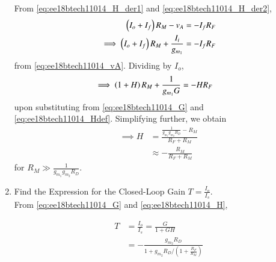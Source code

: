 \begin{enumerate}[label=\thesubsection.\arabic*.,ref=\thesubsection.\theenumi]
From \eqref{eq:ee18btech11014_H_der1}
 and \eqref{eq:ee18btech11014_H_der2},
\begin{align}
\left(I_o + I_f\right)R_M - v_{A} &= -I_fR_F
\\
\implies \left(I_o + I_f\right)R_M + \frac{I_i}{g_{m_1}} &=-I_fR_F
\end{align}
from  \eqref{eq:ee18btech11014_vA}. Dividing by  $I_o $,%
\begin{align}
\implies \left(1 + H\right)R_M + \frac{1}{g_{m_1}G} &=-HR_F 
\end{align}
%
upon substituting from \eqref{eq:ee18btech11014_G}
and \eqref{eq:ee18btech11014_Hdef}.  Simplifying further, we obtain
%
\begin{align}
\implies H &= \frac{\frac{1}{g_{m_1}g_{m_2}R_D} - R_M}{R_F+R_M}
\\
& \approx  -\frac{ R_M}{R_F+R_M}
\label{eq:ee18btech11014_H}
\end{align}
%
for $R_M \gg \frac{1}{g_{m_1}g_{m_2}R_D}$. 
%
\item Find the Expression for the Closed-Loop Gain $T=\frac{I_{o}}{I_{s}}$. 
\\
\solution 
From \eqref{eq:ee18btech11014_G}
 and \eqref{eq:ee18btech11014_H}, 

\begin{align}
\label{eq:ee18btech11014_T}
T &= \frac{I_{o}}{I_{s}} = \frac{G}{1+GH}\\
&=-\frac{g_{m_{2}} R_{D}}{1+g_{m_{2}} R_{D} /\left(1+\frac{R_{F}}{R_{M}}\right)}
\end{align}

\end{enumerate}
